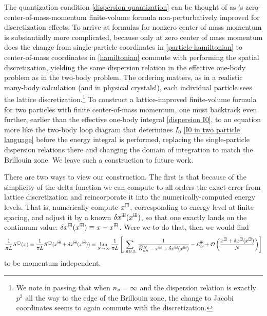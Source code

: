 The quantization condition \eqref{dispersion quantization} can be thought of as \Luscher's zero-center-of-mass-momentum finite-volume formula non-perturbatively improved for discretization effects.
To arrive at formulas for nonzero center of mass momentum is substantially more complicated, because only at zero center of mass momentum does the change from single-particle coordinates in \eqref{particle hamiltonian} to center-of-mass coordinates in \eqref{hamiltonian} commute with performing the spatial discretization, yielding the same dispersion relation in the effective one-body problem as in the two-body problem.
The ordering matters, as in a realistic many-body calculation (and in physical crystals!), each individual particle sees the lattice discretization.\footnote{
We note in passing that when ${n_s}=\infty$ and the dispersion relation is exactly $p^2$ all the way to the edge of the Brillouin zone, the change to Jacobi coordinates seems to again commute with the discretization.}
To construct a lattice-improved finite-volume formula for two particles with finite center-of-mass momentum, one must backtrack even further, earlier than the effective one-body integral \eqref{dispersion I0}, to an equation more like the two-body loop diagram that determines $I_0$ \eqref{I0 in two particle language} before the energy integral is performed, replacing the single-particle dispersion relations there and changing the domain of integration to match the Brillouin zone.
We leave such a construction to future work.

There are two ways to view our construction.
The first is that because of the simplicity of the delta function we can compute to all orders the exact error from lattice discretization and reincorporate it into the numerically-computed energy levels.
That is, numerically compute $x^\boxplus$, corresponding to energy level at finite spacing, and adjust it by a known $\delta x^\boxplus(x^\boxplus)$, so that one exactly lands on the continuum value: $\delta x^\boxplus(x^\boxplus) \equiv x - x^\boxplus$.
Were we to do that, then we would find
\begin{equation}
    \frac{1}{\pi L}S^\bigcirc(x)
    =
    \frac{1}{\pi L}S^\bigcirc(x^\boxplus+\delta x^\boxplus(x^\boxplus))
    =
    \lim_{N\to \infty}
    \frac{1}{\pi L}\left[
        \sum_{n\in\text{B.Z.}}\frac{1}{\tilde{K}^N_{nn}-x^\boxplus+\delta x^\boxplus(x^\boxplus)} - \mathcal{L}^\boxplus_D + \mathcal{O}\left(\frac{x^\boxplus+\delta x^\boxplus(x^\boxplus)}{N}\right)
    \right]
\end{equation}
to be momentum independent.

